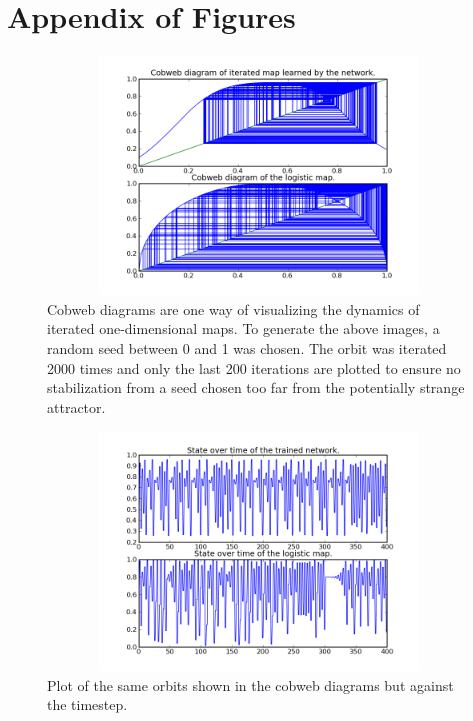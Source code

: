 \documentclass[12pt]{article}
\begin{document}
\section{Appendix of Figures}
\begin{figure}[htb]
\begin{center}
\includegraphics[height=2.5in,width=4.5in]{images/cobweb_1.png}
\caption{Cobweb diagrams are one way of visualizing the dynamics of iterated one-dimensional maps.  To generate the above images, a random seed between 0 and 1 was chosen.  The orbit was iterated 2000 times and only the last 200 iterations are plotted to ensure no stabilization from a seed chosen too far from the potentially strange attractor.}
\end{center}
\end{figure}
\begin{figure}[htb]
\begin{center}
\includegraphics[height=2.5in,width=4.5in]{images/orbit_1.png}
\caption{Plot of the same orbits shown in the cobweb diagrams but against the timestep.}
\end{center}
\end{figure}
\end{document}
